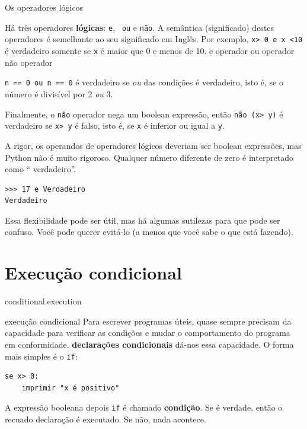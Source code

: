 \documentclass[10pt]{book}
\begin{document}
{\section{} Os operadores lógicos

Há três operadores {\bf lógicas}: {\tt e}, {\tt
ou} e {\tt não}. A semântica (significado) destes operadores é
semelhante ao seu significado em Inglês. Por exemplo,
{\tt x> 0 e x <10} é verdadeiro somente se {\tt x} é maior que 0
{\Em} e menos de 10.
\index{} e operador
\index{} ou operador
\index{} não operador

{\tt n \2 == 0 ou n \3 == 0} é verdadeiro se {\em ou} das condições
é verdadeiro, isto é, se o número é divisível por 2 {\em ou} 3.

Finalmente, o {\tt não} operador nega um boolean
expressão, então {\tt não (x> y)} é verdadeiro se {\tt x> y} é falso,
isto é, se {\tt x} é inferior ou igual a {\tt y}.

A rigor, os operandos de operadores lógicos deveriam ser
boolean expressões, mas Python não é muito rigoroso.
Qualquer número diferente de zero é interpretado como `` verdadeiro''.

\begin{verbatim}
>>> 17 e Verdadeiro
Verdadeiro
\end{verbatim}
%
Essa flexibilidade pode ser útil, mas há algumas sutilezas para
que pode ser confuso. Você pode querer evitá-lo (a menos que
você sabe o que está fazendo).


\section{Execução condicional}
\label{} conditional.execution

\index{} execução condicional
Para escrever programas úteis, quase sempre precisam da capacidade
para verificar as condições e mudar o comportamento do programa
em conformidade. {\bf declarações condicionais} dá-nos essa capacidade. O
forma mais simples é o {\tt if}:

\begin{verbatim}
se x> 0:
    imprimir "x é positivo"
\end{verbatim}
%
A expressão booleana depois {\tt if} é
chamado {\bf condição}. Se é verdade, então o recuado
declaração é executado. Se não, nada acontece.

}
\end{document}

